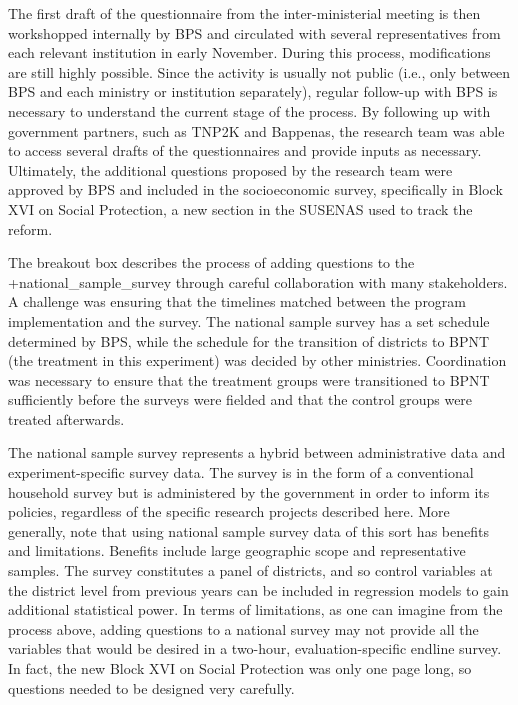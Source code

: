 \documentclass[
]{WileySix}
\begin{document}
\begin{bbox}
\begin{bbox}
The first draft of the questionnaire from the inter-ministerial meeting is then workshopped internally by BPS and circulated with several representatives from each relevant institution in early November. During this process, modifications are still highly possible. Since the activity is usually not public (i.e., only between BPS and each ministry or institution separately), regular follow-up with BPS is necessary to understand the current stage of the process. By following up with government partners, such as TNP2K and Bappenas, the research team was able to access several drafts of the questionnaires and provide inputs as necessary. Ultimately, the additional questions proposed by the research team were approved by BPS and included in the socioeconomic survey, specifically in Block XVI on Social Protection, a new section in the SUSENAS used to track the reform.

\end{bbox}
\end{bbox}

The breakout box describes the process of adding questions to the +national\_sample\_survey\textbar{} through careful collaboration with many stakeholders. A challenge was ensuring that the timelines matched between the program implementation and the survey. The national sample survey has a set schedule determined by BPS, while the schedule for the transition of districts to BPNT (the treatment in this experiment) was decided by other ministries. Coordination was necessary to ensure that the treatment groups were transitioned to BPNT sufficiently before the surveys were fielded and that the control groups were treated afterwards.

The national sample survey represents a hybrid between administrative data and experiment-specific survey data. The survey is in the form of a conventional household survey but is administered by the government in order to inform its policies, regardless of the specific research projects described here. More generally, note that using national sample survey data of this sort has benefits and limitations. Benefits include large geographic scope and representative samples. The survey constitutes a panel of districts, and so control variables at the district level from previous years can be included in regression models to gain additional statistical power. In terms of limitations, as one can imagine from the process above, adding questions to a national survey may not provide all the variables that would be desired in a two-hour, evaluation-specific endline survey. In fact, the new Block XVI on Social Protection was only one page long, so questions needed to be designed very carefully.
\end{document}
